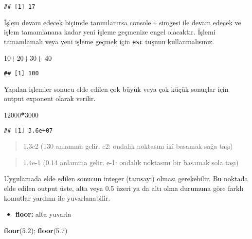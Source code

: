 \documentclass[
]{book}
\newenvironment{Shaded}{\begin{snugshade}}{\end{snugshade}}
\newcommand{\DecValTok}[1]{\textcolor[rgb]{0.00,0.00,0.81}{#1}}
\newcommand{\FloatTok}[1]{\textcolor[rgb]{0.00,0.00,0.81}{#1}}
\newcommand{\KeywordTok}[1]{\textcolor[rgb]{0.13,0.29,0.53}{\textbf{#1}}}
\newcommand{\NormalTok}[1]{#1}
\newcommand{\OperatorTok}[1]{\textcolor[rgb]{0.81,0.36,0.00}{\textbf{#1}}}
\newcommand{\StringTok}[1]{\textcolor[rgb]{0.31,0.60,0.02}{#1}}
\providecommand{\tightlist}{%
  \setlength{\itemsep}{0pt}\setlength{\parskip}{0pt}}
\begin{document}
\begin{verbatim}
## [1] 17
\end{verbatim}

İşlem devam edecek biçimde tanımlanırsa console \texttt{+} simgesi ile devam edecek ve işlem tamamlanana kadar yeni işleme geçmenize engel olacaktır. İşlemi tamamlamalı veya yeni işleme geçmek için \texttt{esc} tuşunu kullanmalısınız.

\begin{Shaded}
\begin{Highlighting}[]
\DecValTok{10}\OperatorTok{+}\DecValTok{20}\OperatorTok{+}\DecValTok{30}\OperatorTok{+}
\StringTok{  }\DecValTok{40}
\end{Highlighting}
\end{Shaded}

\begin{verbatim}
## [1] 100
\end{verbatim}

Yapılan işlemler sonucu elde edilen çok büyük veya çok küçük sonuçlar için output exponent olarak verilir.

\begin{Shaded}
\begin{Highlighting}[]
\DecValTok{12000}\OperatorTok{*}\DecValTok{3000}
\end{Highlighting}
\end{Shaded}

\begin{verbatim}
## [1] 3.6e+07
\end{verbatim}

\begin{quote}
1.3e2 (130 anlamına gelir. e2: ondalık noktasını iki basamak sağa taşı)
\end{quote}

\begin{quote}
1.4e-1 (0.14 anlamına gelir. e-1: ondalık noktasını bir basamak sola taşı)
\end{quote}

Uygulamada elde edilen sonucun integer (tamsayı) olması gerekebilir. Bu noktada elde edilen output üste, alta veya 0.5 üzeri ya da altı olma durumuna göre farklı komutlar yardımı ile yuvarlanabilir.

\begin{itemize}
\tightlist
\item
  \textbf{floor:} alta yuvarla
\end{itemize}

\begin{Shaded}
\begin{Highlighting}[]
\KeywordTok{floor}\NormalTok{(}\FloatTok{5.2}\NormalTok{); }\KeywordTok{floor}\NormalTok{(}\FloatTok{5.7}\NormalTok{)}
\end{Highlighting}
\end{Shaded}
\end{document}
